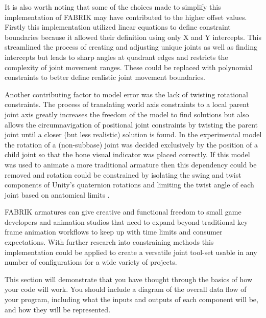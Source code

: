 \documentclass[10pt,twocolumn]{article}
\begin{document}
 It is also worth noting that some of the choices made to simplify this implementation of FABRIK  may have contributed to the higher offset values. Firstly this implementation utilized linear equations to define constraint boundaries because it allowed their definition using only X and Y intercepts. This streamlined the process of creating and adjusting unique joints as well as finding intercepts but leads to sharp angles at quadrant edges and restricts the complexity of joint movement ranges. These could be replaced with polynomial constraints to better define realistic joint movement boundaries.

 Another contributing factor to model error was the lack of twisting rotational constraints. The process of translating world axis constraints to a local parent joint axis greatly increases the freedom of the model to find solutions but also allows the circumnavigation of positional joint constraints by twisting the parent joint until a closer (but less realistic) solution is found. In the experimental model the rotation of a (non-subbase) joint was decided exclusively by the position of a child joint so that the bone visual indicator was placed correctly. If this model was used to animate a more traditional armature then this dependency could be removed and rotation could be constrained by isolating the swing and twist components of Unity's quaternion rotations and limiting the twist angle of each joint based on anatomical limits \cite{swingTwist}.
 
 FABRIK armatures can give creative and functional freedom to small game developers and animation studios that need to expand beyond traditional key frame animation workflows to keep up with time limits and consumer expectations. With further research into constraining methods this implementation could be applied to create a versatile joint tool-set usable in any number of configurations for a wide variety of projects. 
    



This section will demonstrate that you have thought through the basics of how your code will work. You should include a diagram of the overall data flow of your program, including what the inputs and outputs of each component will be, and how they will be represented.

 

\printbibliography
\end{document}
